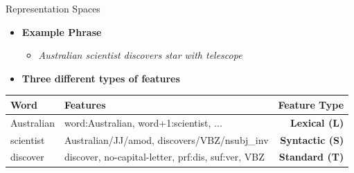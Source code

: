 \documentclass[10pt,=table]{beamer}
\begin{document}
\begin{frame}{Representation Spaces}
\hfill
\begin{itemize}
	\item[] \large \textbf{Example Phrase}
	\begin{itemize}
	\item[] \large \textit{Australian scientist discovers star with telescope}
	\end{itemize} 
\end{itemize}
\hfill
\begin{itemize}
\item[] \large \textbf{Three different types of features}
\end{itemize}

\small

\begin{tabular}{llr}

	\hline 
	 \textbf{Word} & \textbf{Features} & \textbf{Feature Type}\\ 
	\hline 
	Australian & word:Australian, word+1:scientist, ...& \textbf{Lexical (L)}\\ 
	scientist  &  Australian/JJ/amod, discovers/VBZ/nsubj\_inv & \textbf{Syntactic (S)}\\ 
	discover &discover, no-capital-letter, prf:dis, suf:ver, VBZ & \textbf{Standard (T)}\\ 
	\hline 
\end{tabular} 
\vspace{\textheight}
\end{frame}


%	
%	
%	 
%
\end{document}
